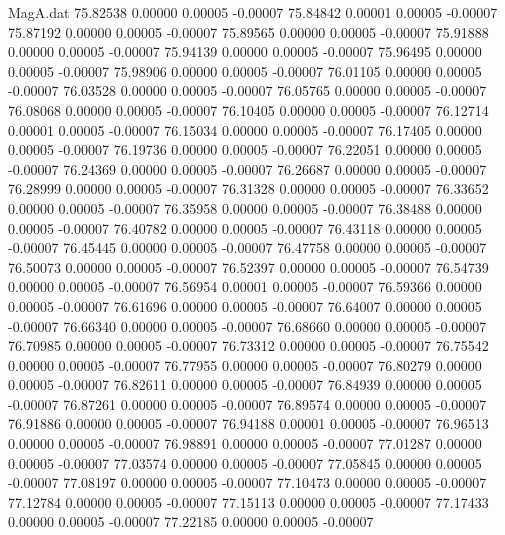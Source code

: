 \begin{filecontents}{MagA.dat}
  75.82538    0.00000    0.00005   -0.00007
  75.84842    0.00001    0.00005   -0.00007
  75.87192    0.00000    0.00005   -0.00007
  75.89565    0.00000    0.00005   -0.00007
  75.91888    0.00000    0.00005   -0.00007
  75.94139    0.00000    0.00005   -0.00007
  75.96495    0.00000    0.00005   -0.00007
  75.98906    0.00000    0.00005   -0.00007
  76.01105    0.00000    0.00005   -0.00007
  76.03528    0.00000    0.00005   -0.00007
  76.05765    0.00000    0.00005   -0.00007
  76.08068    0.00000    0.00005   -0.00007
  76.10405    0.00000    0.00005   -0.00007
  76.12714    0.00001    0.00005   -0.00007
  76.15034    0.00000    0.00005   -0.00007
  76.17405    0.00000    0.00005   -0.00007
  76.19736    0.00000    0.00005   -0.00007
  76.22051    0.00000    0.00005   -0.00007
  76.24369    0.00000    0.00005   -0.00007
  76.26687    0.00000    0.00005   -0.00007
  76.28999    0.00000    0.00005   -0.00007
  76.31328    0.00000    0.00005   -0.00007
  76.33652    0.00000    0.00005   -0.00007
  76.35958    0.00000    0.00005   -0.00007
  76.38488    0.00000    0.00005   -0.00007
  76.40782    0.00000    0.00005   -0.00007
  76.43118    0.00000    0.00005   -0.00007
  76.45445    0.00000    0.00005   -0.00007
  76.47758    0.00000    0.00005   -0.00007
  76.50073    0.00000    0.00005   -0.00007
  76.52397    0.00000    0.00005   -0.00007
  76.54739    0.00000    0.00005   -0.00007
  76.56954    0.00001    0.00005   -0.00007
  76.59366    0.00000    0.00005   -0.00007
  76.61696    0.00000    0.00005   -0.00007
  76.64007    0.00000    0.00005   -0.00007
  76.66340    0.00000    0.00005   -0.00007
  76.68660    0.00000    0.00005   -0.00007
  76.70985    0.00000    0.00005   -0.00007
  76.73312    0.00000    0.00005   -0.00007
  76.75542    0.00000    0.00005   -0.00007
  76.77955    0.00000    0.00005   -0.00007
  76.80279    0.00000    0.00005   -0.00007
  76.82611    0.00000    0.00005   -0.00007
  76.84939    0.00000    0.00005   -0.00007
  76.87261    0.00000    0.00005   -0.00007
  76.89574    0.00000    0.00005   -0.00007
  76.91886    0.00000    0.00005   -0.00007
  76.94188    0.00001    0.00005   -0.00007
  76.96513    0.00000    0.00005   -0.00007
  76.98891    0.00000    0.00005   -0.00007
  77.01287    0.00000    0.00005   -0.00007
  77.03574    0.00000    0.00005   -0.00007
  77.05845    0.00000    0.00005   -0.00007
  77.08197    0.00000    0.00005   -0.00007
  77.10473    0.00000    0.00005   -0.00007
  77.12784    0.00000    0.00005   -0.00007
  77.15113    0.00000    0.00005   -0.00007
  77.17433    0.00000    0.00005   -0.00007
  77.22185    0.00000    0.00005   -0.00007

\end{filecontents}
